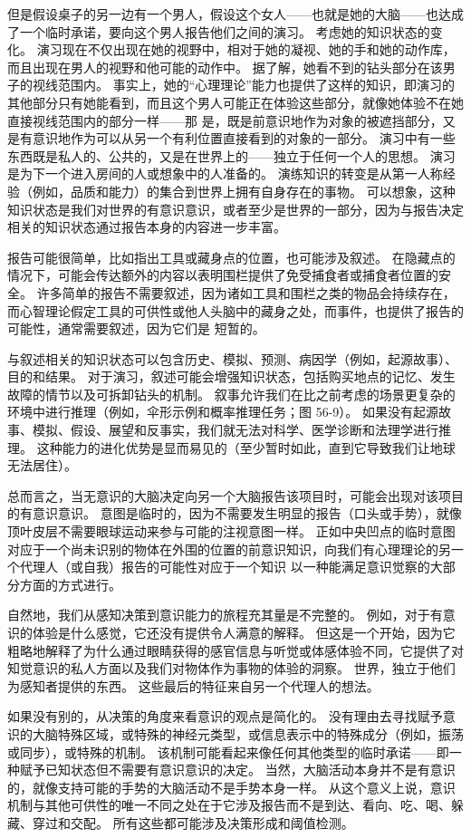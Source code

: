但是假设桌子的另一边有一个男人，假设这个女人——也就是她的大脑——也达成了一个临时承诺，要向这个男人报告他们之间的演习。 考虑她的知识状态的变化。 演习现在不仅出现在她的视野中，相对于她的凝视、她的手和她的动作库，而且出现在男人的视野和他可能的动作中。 据了解，她看不到的钻头部分在该男子的视线范围内。 事实上，她的“心理理论”能力也提供了这样的知识，即演习的其他部分只有她能看到，而且这个男人可能正在体验这些部分，就像她体验不在她直接视线范围内的部分一样——那 是，既是前意识地作为对象的被遮挡部分，又是有意识地作为可以从另一个有利位置直接看到的对象的一部分。 演习中有一些东西既是私人的、公共的，又是在世界上的——独立于任何一个人的思想。 演习是为下一个进入房间的人或想象中的人准备的。 演练知识的转变是从第一人称经验（例如，品质和能力）的集合到世界上拥有自身存在的事物。 可以想象，这种知识状态是我们对世界的有意识意识，或者至少是世界的一部分，因为与报告决定相关的知识状态通过报告本身的内容进一步丰富。

报告可能很简单，比如指出工具或藏身点的位置，也可能涉及叙述。 在隐藏点的情况下，可能会传达额外的内容以表明围栏提供了免受捕食者或捕食者位置的安全。 许多简单的报告不需要叙述，因为诸如工具和围栏之类的物品会持续存在，而心智理论假定工具的可供性或他人头脑中的藏身之处，而事件，也提供了报告的可能性，通常需要叙述，因为它们是 短暂的。

与叙述相关的知识状态可以包含历史、模拟、预测、病因学（例如，起源故事）、目的和结果。 对于演习，叙述可能会增强知识状态，包括购买地点的记忆、发生故障的情节以及可拆卸钻头的机制。 叙事允许我们在比之前考虑的场景更复杂的环境中进行推理（例如，伞形示例和概率推理任务；图 56-9）。 如果没有起源故事、模拟、假设、展望和反事实，我们就无法对科学、医学诊断和法理学进行推理。 这种能力的进化优势是显而易见的（至少暂时如此，直到它导致我们让地球无法居住）。

总而言之，当无意识的大脑决定向另一个大脑报告该项目时，可能会出现对该项目的有意识意识。 意图是临时的，因为不需要发生明显的报告（口头或手势），就像顶叶皮层不需要眼球运动来参与可能的注视意图一样。 正如中央凹点的临时意图对应于一个尚未识别的物体在外围的位置的前意识知识，向我们有心理理论的另一个代理人（或自我）报告的可能性对应于一个知识 以一种能满足意识觉察的大部分方面的方式进行。

自然地，我们从感知决策到意识能力的旅程充其量是不完整的。 例如，对于有意识的体验是什么感觉，它还没有提供令人满意的解释。 但这是一个开始，因为它粗略地解释了为什么通过眼睛获得的感官信息与听觉或体感体验不同，它提供了对知觉意识的私人方面以及我们对物体作为事物的体验的洞察。 世界，独立于他们为感知者提供的东西。 这些最后的特征来自另一个代理人的想法。

如果没有别的，从决策的角度来看意识的观点是简化的。 没有理由去寻找赋予意识的大脑特殊区域，或特殊的神经元类型，或信息表示中的特殊成分（例如，振荡或同步），或特殊的机制。 该机制可能看起来像任何其他类型的临时承诺——即一种赋予已知状态但不需要有意识意识的决定。 当然，大脑活动本身并不是有意识的，就像支持可能的手势的大脑活动不是手势本身一样。 从这个意义上说，意识机制与其他可供性的唯一不同之处在于它涉及报告而不是到达、看向、吃、喝、躲藏、穿过和交配。 所有这些都可能涉及决策形成和阈值检测。

